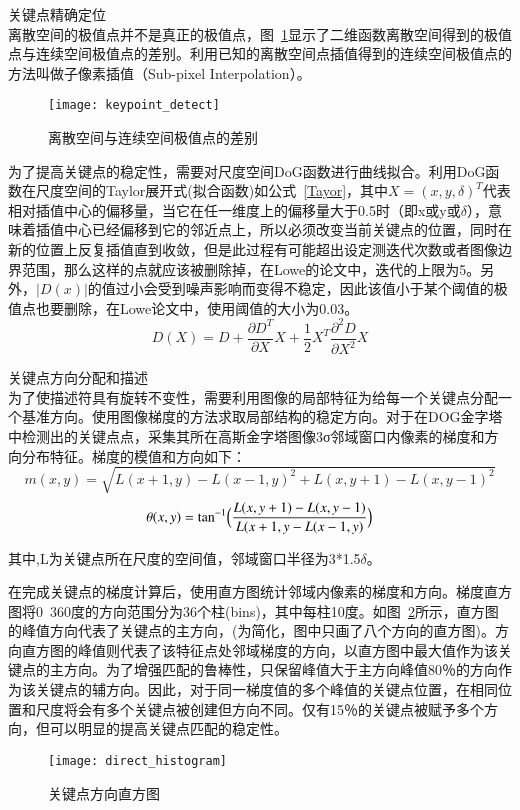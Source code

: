 \begin{compactenum}
\item 关键点精确定位\\离散空间的极值点并不是真正的极值点，图~\ref{fig:keypoint_detect}显示了二维函数离散空间得到的极值点与连续空间极值点的差别。利用已知的离散空间点插值得到的连续空间极值点的方法叫做子像素插值（Sub-pixel Interpolation）。
\begin{figure}[htp]
\centering
\texttt{[image: keypoint\_detect]}
\caption{离散空间与连续空间极值点的差别}
\label{fig:keypoint_detect}
\end{figure}

为了提高关键点的稳定性，需要对尺度空间DoG函数进行曲线拟合。利用DoG函数在尺度空间的Taylor展开式(拟合函数)如公式~\ref{Tayor}，其中$X={(x,y,\delta)^T}$代表相对插值中心的偏移量，当它在任一维度上的偏移量大于0.5时（即x或y或$\delta$），意味着插值中心已经偏移到它的邻近点上，所以必须改变当前关键点的位置，同时在新的位置上反复插值直到收敛，但是此过程有可能超出设定测迭代次数或者图像边界范围，那么这样的点就应该被删除掉，在Lowe的论文中，迭代的上限为5。另外，${|D(x)|}$的值过小会受到噪声影响而变得不稳定，因此该值小于某个阈值的极值点也要删除，在Lowe论文中，使用阈值的大小为0.03。
\begin{equation}\label{Tayor}
D(X)=D+\frac{\partial{D}^T}{\partial{X}}X+\frac{1}{2}X^T\frac{\partial^2{D}}{\partial{X}^2}X
\end{equation}

\item 关键点方向分配和描述\\为了使描述符具有旋转不变性，需要利用图像的局部特征为给每一个关键点分配一个基准方向。使用图像梯度的方法求取局部结构的稳定方向。对于在DOG金字塔中检测出的关键点点，采集其所在高斯金字塔图像3σ邻域窗口内像素的梯度和方向分布特征。梯度的模值和方向如下：
\begin{equation}\label{mozhi}
m(x,y)=\sqrt{L(x+1,y)-{L(x-1,y)}^2+L(x,y+1)-{L(x,y-1)}^2}
\end{equation}
\begin{equation}\label{fangxiang}
\theta(x,y)=\tan^{-1}\Bigl({\frac{L(x,y+1)-L(x,y-1)}{L(x+1,y-L(x-1,y)}}\Bigr)
\end{equation}
\end{compactenum}

其中,L为关键点所在尺度的空间值，邻域窗口半径为3*1.5${\delta}$。

在完成关键点的梯度计算后，使用直方图统计邻域内像素的梯度和方向。梯度直方图将0~360度的方向范围分为36个柱(bins)，其中每柱10度。如图~\ref{fig:direct_histogram}所示，直方图的峰值方向代表了关键点的主方向，(为简化，图中只画了八个方向的直方图)。方向直方图的峰值则代表了该特征点处邻域梯度的方向，以直方图中最大值作为该关键点的主方向。为了增强匹配的鲁棒性，只保留峰值大于主方向峰值80％的方向作为该关键点的辅方向。因此，对于同一梯度值的多个峰值的关键点位置，在相同位置和尺度将会有多个关键点被创建但方向不同。仅有15％的关键点被赋予多个方向，但可以明显的提高关键点匹配的稳定性。
\begin{figure}[htp]
\centering
\texttt{[image: direct\_histogram]}
\caption{关键点方向直方图}
\label{fig:direct_histogram}
\end{figure}

